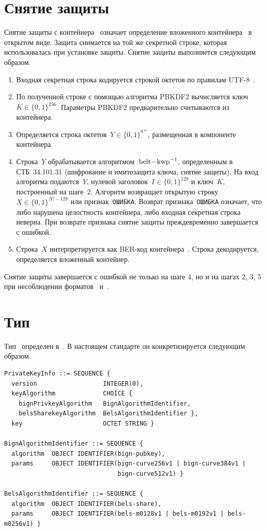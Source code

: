 \section{Снятие защиты}\label{CONT.Unwrap}

Снятие защиты с контейнера~ 
означает определение вложенного контейнера~ 
в открытом виде. Защита снимается на той же секретной строке, которая 
использовалась при установке защиты. 
Снятие защиты выполняется следующим образом.
\begin{enumerate}
\item
Входная секретная строка кодируется строкой октетов по правилам  
UTF-8~\cite{UTF8}. 
\item
По полученной строке с помощью алгоритма PBKDF2
вычисляется ключ~$K\in\{0,1\}^{256}$.
Параметры PBKDF2 предварительно считываются из контейнера.
\item
Определяется строка октетов~$Y\in\{0,1\}^{8*}$, размещенная в 
компоненте~ контейнера. 
\item
Строка~$Y$ обрабатывается алгоритмом~$\code{belt-kwp}^{-1}$, определенным в
СТБ~34.101.31 (шифрование и имитозащита ключа, снятие защиты). На вход алгоритма
подаются~$Y$, нулевой заголовок~$I\in\{0,1\}^{128}$ и ключ~$K$, построенный на
шаге~$2$.
%
Алгоритм возвращает открытую строку~$X\in\{0,1\}^{|Y|-128}$ или 
признак~\texttt{ОШИБКА}.
%
Возврат признака~\texttt{ОШИБКА} означает, что либо нарушена целостность
контейнера, либо входная секретная строка неверна. При возврате признака
снятие защиты преждевременно завершается с ошибкой.
\item
Строка~$X$ интерпретируется как BER-код 
контейнера~. Строка декодируется, определяется 
вложенный контейнер. 
\end{enumerate}

Снятие защиты завершается с ошибкой не только на шаге 4, но и на 
шагах 2, 3, 5 при несоблюдении форматов~ 
и~. 

\section{Тип }\label{CONT.PT}

Тип~ определен в~\cite{PKCS8}.
В настоящем стандарте он конкретизируется следующим образом.
%
\begin{verbatim}
PrivateKeyInfo ::= SEQUENCE {
  version                  INTEGER(0),
  keyAlgorithm             CHOICE {
    bignPrivkeyAlgorithm   BignAlgorithmIdentifier,
    belsSharekeyAlgorithm  BelsAlgorithmIdentifier },
  key                      OCTET STRING }

BignAlgorithmIdentifier ::= SEQUENCE {
  algorithm  OBJECT IDENTIFIER(bign-pubkey),
  params     OBJECT IDENTIFIER(bign-curve256v1 | bign-curve384v1 | 
                               bign-curve512v1) }

BelsAlgorithmIdentifier ::= SEQUENCE {
  algorithm  OBJECT IDENTIFIER(bels-share),
  params     OBJECT IDENTIFIER(bels-m0128v1 | bels-m0192v1 | bels-m0256v1) }
\end{verbatim}

